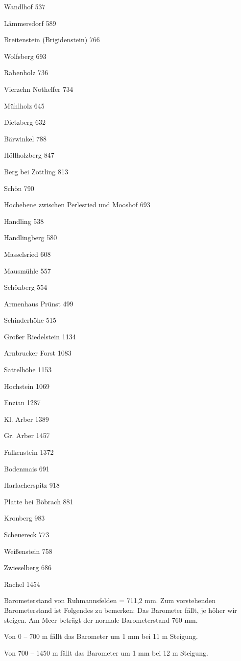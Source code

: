 \documentclass[12pt,a4pager]{book}
\begin{document}
Wandlhof    537

Lämmersdorf 589

Breitenstein (Brigidenstein)    766

Wolfsberg   693

Rabenholz   736

Vierzehn Nothelfer  734

Mühlholz    645

Dietzberg   632

Bärwinkel   788

Höllholzberg    847

Berg bei Zottling   813

Schön   790

Hochebene zwischen Perlesried und Mooshof   693

Handling    538

Handlingberg    580

Masselsried 608

Mausmühle   557

Schönberg   554

Armenhaus Prünst    499

Schinderhöhe    515

Großer Riedelstein  1134

Arnbrucker Forst    1083

Sattelhöhe  1153

Hochstein   1069

Enzian  1287

Kl. Arber   1389

Gr. Arber   1457

Falkenstein 1372

Bodenmais   691

Harlacherspitz  918

Platte bei Böbrach  881

Kronberg    983

Scheuereck  773

Weißenstein 758

Zwieselberg 686

Rachel  1454

Barometerstand von Ruhmannsfelden = 711,2 mm. Zum vorstehenden Barometerstand
ist Folgendes zu bemerken: Das Barometer fällt, je höher wir steigen. Am Meer
beträgt der normale Barometerstand 760 mm.

Von 0 – 700 m fällt das Barometer um 1 mm bei 11 m Steigung.

Von 700 – 1450 m fällt das Barometer um 1 mm bei 12 m Steigung.
\end{document}
